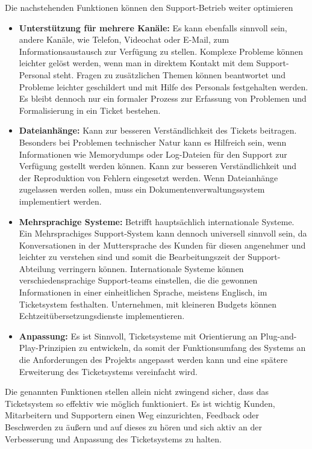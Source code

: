   Die nachstehenden Funktionen können den Support-Betrieb weiter optimieren
  
  \begin{itemize}
			\item \textbf{Unterstützung für mehrere Kanäle:} Es kann ebenfalls sinnvoll sein, andere Kanäle, wie Telefon, Videochat oder E-Mail, zum Informationsaustausch zur Verfügung zu stellen. Komplexe Probleme können leichter gelöst werden, wenn man in direktem Kontakt mit dem Support-Personal steht. Fragen zu zusätzlichen Themen können beantwortet und Probleme leichter geschildert und mit Hilfe des Personals festgehalten werden. Es bleibt dennoch nur ein formaler Prozess zur Erfassung von Problemen und Formalisierung in ein Ticket bestehen. \\
			\item \textbf{Dateianhänge:} Kann zur besseren Verständlichkeit des Tickets beitragen. Besonders bei Problemen technischer Natur kann es Hilfreich sein, wenn Informationen wie Memorydumps oder Log-Dateien für den Support zur Verfügung gestellt werden können. Kann zur besseren Verständlichkeit und der Reproduktion von Fehlern eingesetzt werden. Wenn Dateianhänge zugelassen werden sollen, muss ein Dokumentenverwaltungssystem implementiert werden.\\
			\item \textbf{Mehrsprachige Systeme:} Betrifft hauptsächlich internationale Systeme. Ein Mehrsprachiges Support-System kann dennoch universell sinnvoll sein, da Konversationen in der Muttersprache des Kunden für diesen angenehmer und leichter zu verstehen sind und somit die Bearbeitungszeit der Support-Abteilung verringern können. Internationale Systeme können verschiedensprachige Support-teams einstellen, die die gewonnen Informationen in einer einheitlichen Sprache, meistens Englisch, im Ticketsystem festhalten. Unternehmen, mit kleineren Budgets können Echtzeitübersetzungsdienste implementieren. \\
			\item \textbf{Anpassung:} Es ist Sinnvoll, Ticketsysteme mit Orientierung an Plug-and-Play-Prinzipien zu entwickeln, da somit der Funktionsumfang des Systems an die Anforderungen des Projekts angepasst werden kann und eine spätere Erweiterung des Ticketsystems vereinfacht wird. \\

		\end{itemize}  
  Die genannten Funktionen stellen allein nicht zwingend sicher, dass das Ticketsystem so effektiv wie möglich funktioniert. Es ist wichtig Kunden, Mitarbeitern und Supportern einen Weg einzurichten, Feedback oder Beschwerden zu äußern und auf dieses zu hören und sich aktiv an der Verbesserung und Anpassung des Ticketsystems zu halten. \\
